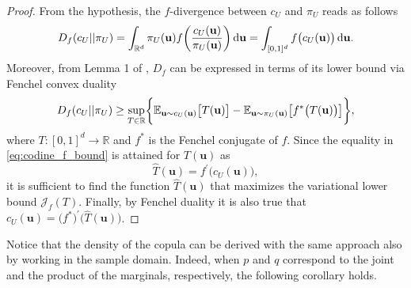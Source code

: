 \begin{proof}
From the hypothesis, the $f$-divergence between $c_U$ and $\pi_U$ reads as follows
\begin{equation}
\small
D_f(c_U||\pi_U) = \int_{\mathbb{R}^d}{\pi_U(\mathbf{u})f\biggl(\frac{c_U(\mathbf{u})}{\pi_U(\mathbf{u})}\biggr)\mathop{}\!\mathrm{d} \mathbf{u}} = \int_{[0,1]^d}{f\bigl(c_U(\mathbf{u})\bigr)\mathop{}\!\mathrm{d} \mathbf{u}}.
\end{equation}
Moreover, from Lemma 1 of \cite{Nguyen2010}, $D_f$ can be expressed in terms of its lower bound via Fenchel convex duality
\begin{equation}
\small
\label{eq:codine_f_bound}
D_f(c_U||\pi_U) \geq \sup_{T\in \mathbb{R}} \biggl\{ \mathbb{E}_{\mathbf{u} \sim c_U(\mathbf{u})} \bigl[T(\mathbf{u})\bigr]-\mathbb{E}_{\mathbf{u}\sim \pi_U(\mathbf{u})}\bigl[f^*\bigl(T(\mathbf{u})\bigr)\bigr]\biggr\},
\end{equation}
where $T: [0,1]^d \to \mathbb{R}$ and $f^*$ is the Fenchel conjugate of $f$.
Since the equality in \eqref{eq:codine_f_bound} is attained for $T(\mathbf{u})$ as
\begin{equation}
\hat{T}(\mathbf{u}) = f^{\prime} \bigl(c_U(\mathbf{u})\bigr),
\end{equation}
it is sufficient to find the function $\hat{T}(\mathbf{u})$ that maximizes the variational lower bound $\mathcal{J}_{f}(T)$.
Finally, by Fenchel duality it is also true that
$c_U(\mathbf{u}) = \bigl(f^{*}\bigr)^{\prime} \bigl(\hat{T}(\mathbf{u})\bigr)$.
\end{proof}

Notice that the density of the copula can be derived with the same approach also by working in the sample domain. Indeed, when $p$ and $q$ correspond to the joint and the product of the marginals, respectively, the following corollary holds.

